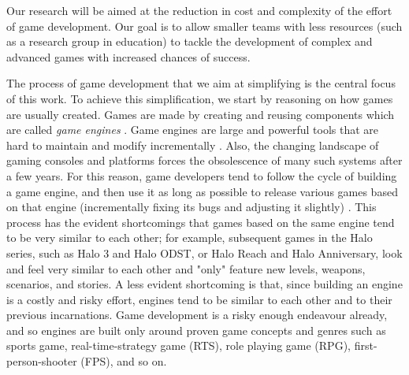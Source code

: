 Our research will be aimed at the reduction in cost and complexity of the effort of game development. Our goal is to allow smaller teams with less resources (such as a research group in education) to tackle the development of complex and advanced games with increased chances of success.

The process of game development that we aim at simplifying is the central focus of this work. To achieve this simplification, we start by reasoning on how games are usually created. Games are made by creating and reusing components which are called \textit{game engines} \cite{CHAPTER_1_GAME_ENGINES}. Game engines are large and powerful tools that are hard to maintain and modify incrementally \cite{CHAPTER_1_GAME_ENGINES}. Also, the changing landscape of gaming consoles and platforms forces the obsolescence of many such systems after a few years. For this reason, game developers tend to follow the cycle of building a game engine, and then use it as long as possible to release various games based on that engine (incrementally fixing its bugs and adjusting it slightly) \cite{CHAPTER_1_GAME_ENGINES_MUST_BE_REBUILT_OFTEN}. This process has the evident shortcomings that games based on the same engine tend to be very similar to each other; for example, subsequent games in the Halo series, such as Halo 3 and Halo ODST, or Halo Reach and Halo Anniversary, look and feel very similar to each other and "only" feature new levels, weapons, scenarios, and stories. A less evident shortcoming is that, since building an engine is a costly and risky effort, engines tend to be similar to each other and to their previous incarnations. Game development is a risky enough endeavour already, and so engines are built only around proven game concepts and genres such as sports game, real-time-strategy game (RTS), role playing game (RPG), first-person-shooter (FPS), and so on.


